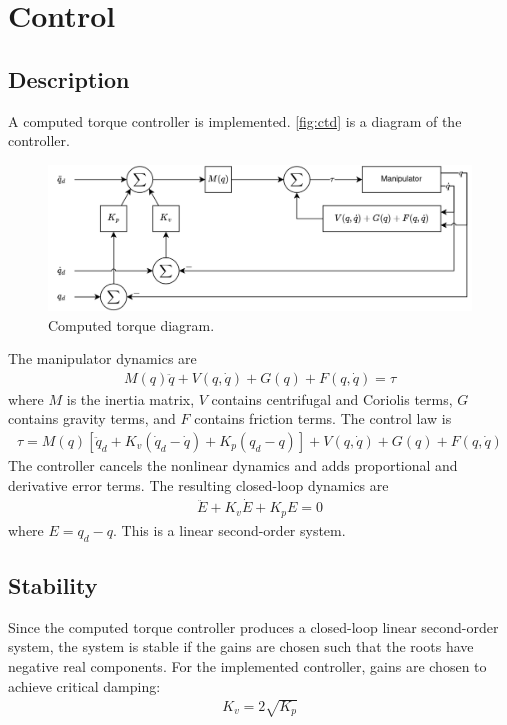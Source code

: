 \documentclass{article}
\begin{document}
\pagebreak
\section{Control}

\subsection{Description}

A computed torque controller is implemented. \autoref{fig:ctd} is a diagram of the controller.
\begin{figure}[h]
  \centering
  \includegraphics[width=0.75\linewidth]{computed_torque_diagram}
  \caption{Computed torque diagram.}
  \label{fig:ctd}
\end{figure}
The manipulator dynamics are
\begin{align}
  M(q)\ddot{q} + V(q, \dot{q}) + G(q) + F(q, \dot{q}) = \tau
\end{align}
where $M$ is the inertia matrix, $V$ contains centrifugal and Coriolis terms, $G$ contains gravity terms, and $F$
contains friction terms. The control law is
\begin{align}
  \tau = M(q)[\ddot{q}_d + K_v(\dot{q}_d - \dot{q}) + K_p(q_d - q)] + V(q, \dot{q}) + G(q) + F(q, \dot{q})
\end{align}
The controller cancels the nonlinear dynamics and adds proportional and derivative error terms.
The resulting closed-loop dynamics are
\begin{align}
  \ddot{E} + K_v \dot{E} + K_p E = 0 \label{eq:cld}
\end{align}
where $E = q_d - q$. This is a linear second-order system.

\subsection{Stability}

Since the computed torque controller produces a closed-loop linear second-order system, the system is stable if the
gains are chosen such that the roots have negative real components.
For the implemented controller, gains are chosen to achieve critical damping:
\begin{align}
  K_v = 2 \sqrt{K_p}
\end{align}
\end{document}
